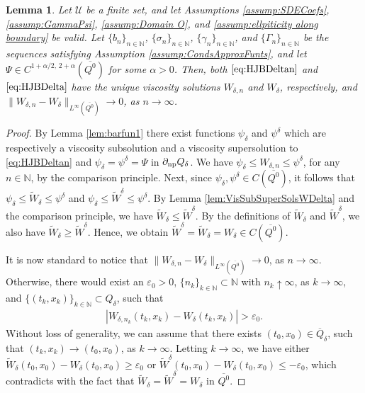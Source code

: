 \documentclass[amscd,amssymb,11pt]{article}
\newtheorem{lemma}[theorem]{Lemma}
\numberwithin{theorem}{section}
\numberwithin{equation}{section}
\begin{document}
\begin{lemma}\label{lem:ConvWdeltanWdelta}
Let $\mathcal{U}$ be a finite set, and let Assumptions \ref{assump:SDECoefs}, \ref{assump:GammaPsi}, \ref{assump:Domain O}, and \ref{assump:ellpiticity along boundary} be valid. Let $\{b_{n}\}_{n\in\mathbb{N}}$, $\{\sigma_{n}\}_{n\in\mathbb{N}}$, $\{\gamma_{n}\}_{n\in\mathbb{N}}$, and $\{\Gamma_{n}\}_{n\in\mathbb{N}}$ be the sequences satisfying Assumption \ref{assump:CondsApproxFunts}, and let $\Psi\in C^{1+\alpha/2,\,2+\alpha}(\overline{Q^{0}})$ for some $\alpha>0$. Then, both $\eqref{eq:HJBDeltan}$ and $\eqref{eq:HJBDelta}$ have the unique viscosity solutions $W_{\delta,n}$ and $W_{\delta}$, respectively, and $\|W_{\delta,n}-W_{\delta}\|_{L^{\infty}(\overline{Q^{0}})}\rightarrow 0$, as $n\rightarrow\infty$.
\end{lemma}
\begin{proof}
By Lemma \ref{lem:barfun1} there exist functions $\psi_{\delta}$ and $\psi^{\delta}$ which are respectively a viscosity subsolution and a viscosity supersolution to \eqref{eq:HJBDeltan} and $\psi_{\delta}=\psi^{\delta}=\Psi$ in $\partial_{{\rm np}}Q_\delta$. We have $\psi_{\delta}\leq W_{\delta,n}\leq\psi^{\delta}$, for any $n\in\mathbb{N}$, by the comparison principle. Next, since $\psi_{\delta},\psi^{\delta}\in C(\overline{Q^{0}})$, it follows that $\psi_{\delta}\leq\widetilde{W}_{\delta}\leq\psi^{\delta}$ and
$\psi_{\delta}\leq\widetilde{W}^{\delta}\leq\psi^{\delta}$. By Lemma \ref{lem:VisSubSuperSolsWDelta} and the comparison principle, we have $\widetilde{W}_{\delta}\leq\widetilde{W}^{\delta}$. By the definitions of $\widetilde{W}_{\delta}$ and $\widetilde{W}^{\delta}$, we also have $\widetilde{W}_{\delta}\geq\widetilde{W}^{\delta}$. Hence, we obtain $\widetilde{W}^{\delta}=\widetilde{W}_{\delta}=W_{\delta}\in C(\overline{Q^{0}})$.

It is now standard to notice that $\|W_{\delta,n}-W_{\delta}\|_{L^{\infty}(\overline{Q^{0}})}\rightarrow 0$, as $n\rightarrow\infty$. Otherwise, there would exist an $\varepsilon_{0}>0$, $\{n_{k}\}_{k\in\mathbb{N}}\subset\mathbb{N}$ with $n_{k}\uparrow\infty$, as $k\rightarrow\infty$, and $\{(t_{k},x_{k})\}_{k\in\mathbb{N}}\subset Q_{\delta}$, such that
\begin{align*}
\left|W_{\delta,n_{k}}(t_{k},x_{k})-W_{\delta}(t_{k},x_{k})\right|>\varepsilon_{0}.
\end{align*}
Without loss of generality, we can assume that there exists $(t_{0},x_{0})\in\overline{Q}_{\delta}$, such that $(t_{k},x_{k})\rightarrow (t_{0},x_{0})$, as $k\rightarrow\infty$. Letting $k\rightarrow\infty$, we have either $\widetilde{W}_{\delta}(t_{0},x_{0})-W_{\delta}(t_{0},x_{0})\geq\varepsilon_{0}$ or $\widetilde{W}^{\delta}(t_{0},x_{0})-W_{\delta}(t_{0},x_{0})\leq -\varepsilon_{0}$, which contradicts with the fact that $\widetilde{W}_{\delta}=\widetilde{W}^{\delta}=W_{\delta}$ in $\overline{Q^{0}}$.
\end{proof}
\end{document}
